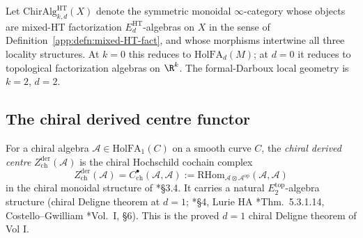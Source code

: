 \begin{defn}\label{app:defn:ChirAlg-HT}
Let $\mathrm{ChirAlg}^{\mathrm{HT}}_{k,d}(X)$ denote the symmetric
monoidal $\infty$-category whose objects are mixed-HT factorization
$E_d^{\mathrm{HT}}$-algebras on $X$ in the sense of
Definition~\ref{app:defn:mixed-HT-fact}, and whose morphisms intertwine
all three locality structures.  At $k=0$ this reduces to
$\mathrm{HolFA}_d(M)$; at $d=0$ it reduces to topological factorization
algebras on $\R^k$.  The formal-Darboux local geometry is $k=2$, $d=2$.
\end{defn}

\subsection{The chiral derived centre functor}\label{app:hfc:chiral-Z-der}

\begin{defn}[Chiral derived centre at $d=1$]\label{app:defn:Z-der-ch-d1}
For a chiral algebra $\mathcal A\in\mathrm{HolFA}_1(C)$ on a smooth
curve $C$, the \emph{chiral derived centre}
$Z^{\mathrm{der}}_{\mathrm{ch}}(\mathcal A)$ is the chiral Hochschild
cochain complex
\[
  Z^{\mathrm{der}}_{\mathrm{ch}}(\mathcal A)
   =C^\bullet_{\mathrm{ch}}(\mathcal A,\mathcal A)
   :=\mathrm{RHom}_{\mathcal A\otimes\mathcal A^{\mathrm{op}}}(\mathcal A,\mathcal A)
\]
in the chiral monoidal structure of
\cite{beilinson-drinfeld-chiral}*{\S 3.4}.  It carries a natural
\(E_2^{\mathrm{top}}\)-algebra structure (chiral Deligne theorem at \(d=1\);
\cite{beilinson-drinfeld-chiral}*{\S 4}, Lurie HA
\cite{lurie-ha}*{Thm.~5.3.1.14}, Costello--Gwilliam
\cite{costello-gwilliam}*{Vol.~I, \S 6}).  This is the proved $d=1$
chiral Deligne theorem of Vol I.
\end{defn}

